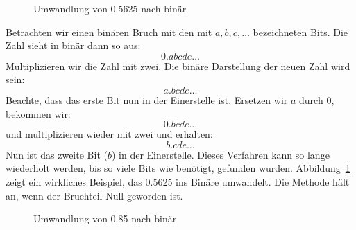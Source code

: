 \begin{figure}[t]
\centering
{} \caption{Umwandlung von 0.5625 nach bin\"{a}r \label{fig:binConvert1}}
\end{figure}

Betrachten wir einen bin\"{a}ren Bruch mit den mit $a, b, c, \ldots$
bezeichneten Bits. Die Zahl sieht in bin\"{a}r dann so aus:
 \[ 0.abcde\ldots \]
Multiplizieren wir die Zahl mit zwei. Die bin\"{a}re Darstellung der
neuen Zahl wird sein:
 \[ a.bcde\ldots \]
Beachte, dass das erste Bit nun in der Einerstelle ist. Ersetzen wir
$a$ durch $0$, bekommen wir:
 \[ 0.bcde\ldots \]
und multiplizieren wieder mit zwei und erhalten:
 \[ b.cde\ldots \]
Nun ist das zweite Bit ($b$) in der Einerstelle. Dieses Verfahren
kann so lange wiederholt werden, bis so viele Bits wie ben\"{o}tigt,
gefunden wurden. Abbildung~\ref{fig:binConvert1} zeigt ein
wirkliches Beispiel, das 0.5625 ins Bin\"{a}re umwandelt. Die Methode
h\"{a}lt an, wenn der Bruchteil Null geworden ist.

\begin{figure}[th]
\centering
{} \caption{Umwandlung von 0.85 nach bin\"{a}r \label{fig:binConvert2}}
\end{figure}

